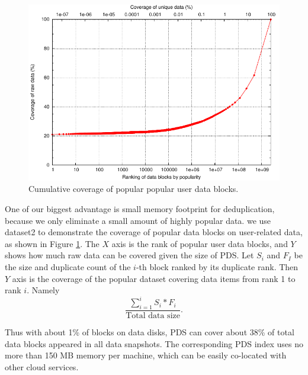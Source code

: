 \begin{figure}
\centering
\includegraphics[width=5in]{images/ay41a_big_data_disk_cdf.pdf}
\caption{Cumulative  coverage of popular popular user data blocks.}
\label{fig:userdatacoverage}
\end{figure}

One of our biggest advantage is small memory footprint for deduplication, because we only
eliminate a small amount of highly popular data.
we use dataset2 to demonstrate the coverage of popular data blocks on user-related data,
as shown in Figure \ref{fig:userdatacoverage}.
The $X$ axis is the rank of popular user data blocks, and $Y$ shows how much raw data can be covered given
the size of PDS.
Let $S_i$ and $F_I$ be the size and duplicate count
of the $i$-th block ranked by its duplicate rank.  Then $Y$ axis is the coverage of
the popular dataset covering data items from rank 1 to rank $i$. Namely
\[
\frac{ \sum_{i=1}^{i} S_i * F_i} {\mbox{Total data size}}.
\]

Thus with about 1\% of blocks on data disks, PDS can cover about 38\% of total data blocks
appeared in all data snapshots. The corresponding PDS index uses no more than 150 MB memory per machine,
which can be easily co-located with other cloud services.


